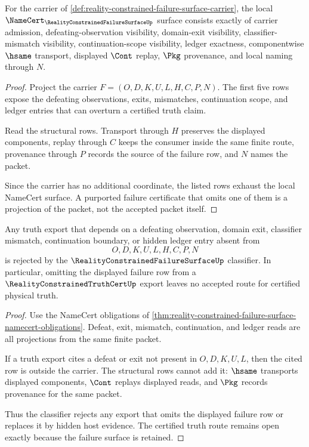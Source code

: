 \begin{theorem}
\label{thm:reality-constrained-failure-surface-namecert-obligations}
For the carrier of \autoref{def:reality-constrained-failure-surface-carrier}, the local $\NameCert_{\RealityConstrainedFailureSurfaceUp}$ surface consists exactly of carrier admission, defeating-observation visibility, domain-exit visibility, classifier-mismatch visibility, continuation-scope visibility, ledger exactness, componentwise $\hsame$ transport, displayed $\Cont$ replay, $\Pkg$ provenance, and local naming through $N$.
\end{theorem}
\begin{proof}
Project the carrier $F=(O,D,K,U,L,H,C,P,N)$. The first five rows expose the defeating observations, exits, mismatches, continuation scope, and ledger entries that can overturn a certified truth claim.

Read the structural rows. Transport through $H$ preserves the displayed components, replay through $C$ keeps the consumer inside the same finite route, provenance through $P$ records the source of the failure row, and $N$ names the packet.

Since the carrier has no additional coordinate, the listed rows exhaust the local NameCert surface. A purported failure certificate that omits one of them is a projection of the packet, not the accepted packet itself.
\end{proof}

\begin{theorem}
\label{thm:reality-constrained-failure-surface-nonescape}
Any truth export that depends on a defeating observation, domain exit, classifier mismatch, continuation boundary, or hidden ledger entry absent from
$$
O,D,K,U,L,H,C,P,N
$$
is rejected by the $\RealityConstrainedFailureSurfaceUp$ classifier. In particular, omitting the displayed failure row from a $\RealityConstrainedTruthCertUp$ export leaves no accepted route for certified physical truth.
\end{theorem}
\begin{proof}
Use the NameCert obligations of \autoref{thm:reality-constrained-failure-surface-namecert-obligations}. Defeat, exit, mismatch, continuation, and ledger reads are all projections from the same finite packet.

If a truth export cites a defeat or exit not present in $O,D,K,U,L$, then the cited row is outside the carrier. The structural rows cannot add it: $\hsame$ transports displayed components, $\Cont$ replays displayed reads, and $\Pkg$ records provenance for the same packet.

Thus the classifier rejects any export that omits the displayed failure row or replaces it by hidden host evidence. The certified truth route remains open exactly because the failure surface is retained.
\end{proof}

